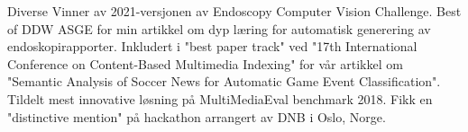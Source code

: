 \begin{rubric}{Diverse}
\entry*[2021] Vinner av 2021-versjonen av Endoscopy Computer Vision Challenge.
%
\entry*[2019] Best of DDW ASGE for min artikkel om dyp læring for automatisk generering av endoskopirapporter.
%
\entry*[2019] Inkludert i "best paper track" ved "17th International Conference on Content-Based Multimedia Indexing" for vår artikkel om "Semantic Analysis of Soccer News for Automatic Game Event Classification".
%
\entry*[2018] Tildelt mest innovative løsning på MultiMediaEval benchmark 2018.
%
\entry*[2017] Fikk en "distinctive mention" på hackathon arrangert av DNB i Oslo, Norge.

\end{rubric}